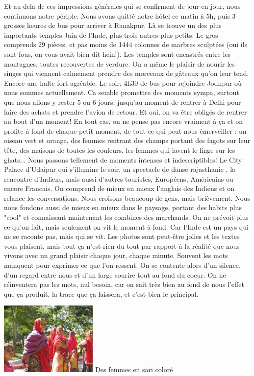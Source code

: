 \begin{multicols}{2}
Et au dela de ces impressions générales qui se confirment de jour en jour, nous continuons notre périple. Nous avons quitté notre hôtel ce matin à 5h, puis 3 grosses heures de bus pour arriver à Ranakpur. Là se trouve un des plus importants temples Jain de l'Inde, plus trois autres plus petits. Le gros comprends 29 pièces, et pas moins de 1444 colonnes de marbres sculptées (oui ils sont fous, on vous avait bien dit hein!). Les temples sont encastrés entre les montagnes, toutes recouvertes de verdure. On a même le plaisir de nourir les singes qui viennent calmement prendre des morceaux de gâteaux qu'on leur tend. Encore une halte fort agréable. Le soir, 4h30 de bus pour rejoindre Jodhpur où nous sommes actuellement. Ca semble promettre des moments sympa, surtout que nous allons y rester 5 ou 6 jours, jusqu'au moment de rentrer à Delhi pour faire des achats et prendre l'avion de retour. Et oui, on va être obligés de rentrer au bout d'un moment! En tout cas, on ne pense pas encore vraiment à ça et on profite à fond de chaque petit moment, de tout ce qui peut nous émerveiller : un oiseau vert et orange, des femmes rentrant des champs portant des fagots sur leur tête, des maisons de toutes les couleurs, les femmes qui lavent le linge sur les ghats... Nous passons tellement de moments intenses et indescriptibles! Le City Palace d'Udaipur qui s'illumine le soir, un spectacle de danse rajasthanie , la rencontre d'Indiens, mais aussi d'autres touristes, Européens, Américains ou encore Francais. On comprend de mieux en mieux l'anglais des Indiens et on relance les conversations. Nous croisons beaucoup de gens, mais brièvement. Nous nous fondons aussi de mieux en mieux dans le paysage, portant des habits plus "cool" et connaissant maintenant les combines des marchands. On ne prévoit plus ce qu'on fait, mais seulement on vit le moment à fond. Car l'Inde est un pays qui ne se raconte pas, mais qui se vit. Les photos sont peut-être jolies et les textes vous plaisent, mais tout ça n'est rien du tout par rapport à la réalité que nous vivons avec un grand plaisir chaque jour, chaque minute. Souvent les mots manquent pour exprimer ce que l'on ressent. On se contente alors d'un silence, d'un regard entre nous et d'un large sourire tout au fond du coeur. On ne réinventera pas les mots, nul besoin, car on sait très bien au fond de nous l'effet que ça produit, la trace que ça laissera, et c'est bien le principal.

\hspace*{-0.65cm}
\includegraphics[width=4.8cm]{articles/Il-commence-a-faire-chaud/sari.jpg}
Des femmes en sari coloré


\end{multicols}
